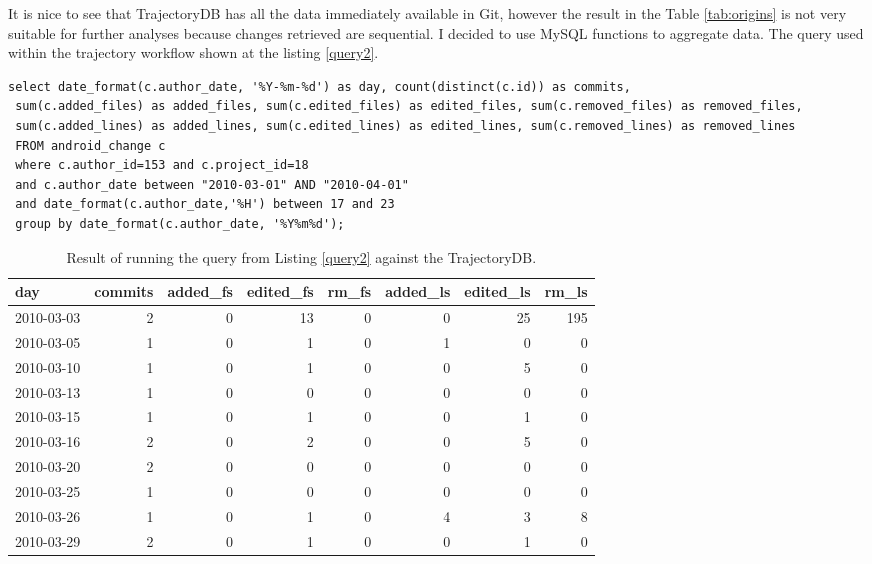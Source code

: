 \documentclass[a4paper,10pt]{article}
\numberwithin{equation}{subsection}
\begin{document}
It is nice to see that TrajectoryDB has all the data immediately available in Git, however the result in the Table 
\ref{tab:origins} is not very suitable for further analyses because changes retrieved are sequential. I decided to
use MySQL functions to aggregate data. The query used within the trajectory workflow shown at the listing 
\ref{query2}.

\noindent\begin{minipage}{\textwidth}
\begin{lstlisting}[label=query2,caption=Data summary retrieval SQL query with aggergation by date]
select date_format(c.author_date, '%Y-%m-%d') as day, count(distinct(c.id)) as commits, 
 sum(c.added_files) as added_files, sum(c.edited_files) as edited_files, sum(c.removed_files) as removed_files, 
 sum(c.added_lines) as added_lines, sum(c.edited_lines) as edited_lines, sum(c.removed_lines) as removed_lines 
 FROM android_change c 
 where c.author_id=153 and c.project_id=18 
 and c.author_date between "2010-03-01" AND "2010-04-01"
 and date_format(c.author_date,'%H') between 17 and 23 
 group by date_format(c.author_date, '%Y%m%d');
\end{lstlisting}
\end{minipage}

\begin{table}[hb]
\noindent\begin{minipage}{\textwidth}
  \caption{Result of running the query from Listing \ref{query2} against the TrajectoryDB.}
  \begin{tabularx}{\textwidth}{ | X | r | r | r | r | r | r | r | }
  \hline           
day & commits & added\_fs & edited\_fs & rm\_fs & added\_ls & edited\_ls & rm\_ls\\ 
\hline           
2010-03-03 & 2 & 0 & 13 & 0 & 0 & 25 & 195\\ 
2010-03-05 & 1 & 0 & 1 & 0 & 1 & 0 & 0\\ 
2010-03-10 & 1 & 0 & 1 & 0 & 0 & 5 & 0\\ 
2010-03-13 & 1 & 0 & 0 & 0 & 0 & 0 & 0\\ 
2010-03-15 & 1 & 0 & 1 & 0 & 0 & 1 & 0\\ 
2010-03-16 & 2 & 0 & 2 & 0 & 0 & 5 & 0\\ 
2010-03-20 & 2 & 0 & 0 & 0 & 0 & 0 & 0\\ 
2010-03-25 & 1 & 0 & 0 & 0 & 0 & 0 & 0\\ 
2010-03-26 & 1 & 0 & 1 & 0 & 4 & 3 & 8\\ 
2010-03-29 & 2 & 0 & 1 & 0 & 0 & 1 & 0\\
\hline    
  \end{tabularx}
\end{minipage}
  \label{tab:second}
\end{table}
\end{document}
